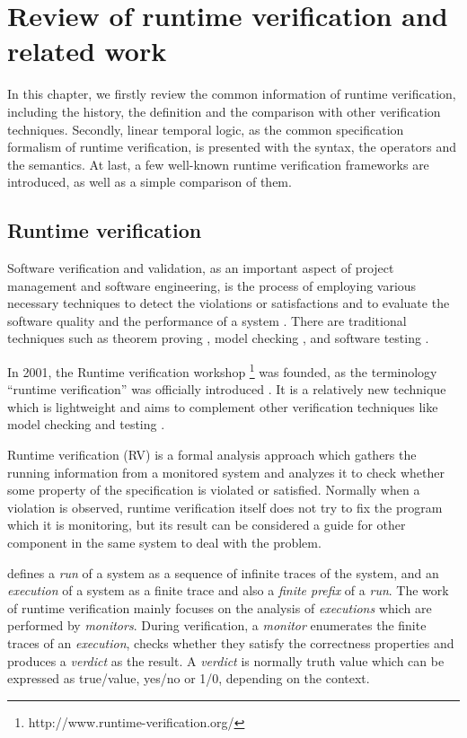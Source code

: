 
\chapter{Review of runtime verification and related work}

In this chapter, we firstly review the common information of runtime verification, including the history, the definition and the comparison with other verification techniques. Secondly, linear temporal logic, as the common specification formalism of runtime verification, is presented with the syntax, the operators and the semantics. At last, a few well-known runtime verification frameworks are introduced, as well as a simple comparison of them.

\section{Runtime verification}

Software verification and validation, as an important aspect of project management and software engineering, is the process of employing various necessary techniques to detect the violations or satisfactions and to evaluate the software quality and the performance of a system \citep{ieeestd2012}. There are traditional techniques such as theorem proving \citep{heisel1990tactical}, model checking \citep{clarke1999model}, and software testing \citep{myers2011art}.

In 2001, the Runtime verification workshop \footnote{http://www.runtime-verification.org/} was founded, as the terminology ``runtime verification'' was officially introduced \citep{wiki:rv}. It is a relatively new technique which is lightweight and aims to complement other verification techniques like model checking and testing \citep{leucker2009brief}. 

Runtime verification (RV) is a formal analysis approach which gathers the running information from a monitored system and analyzes it to check whether some property of the specification is violated or satisfied. Normally when a violation is observed, runtime verification itself does not try to fix the program which it is monitoring, but its result can be considered a guide for other component in the same system to deal with the problem.

\cite{leucker2009brief} defines a \emph{run} of a system as a sequence of infinite traces of the system, and an \emph{execution} of a system as a finite trace and also a \emph{finite prefix} of a \emph{run}. The work of runtime verification mainly focuses on the analysis of \emph{executions} which are performed by \emph{monitors}. During verification, a \emph{monitor} enumerates the finite traces of an \emph{execution}, checks whether they satisfy the correctness properties and produces a \emph{verdict} as the result. A \emph{verdict} is normally truth value which can be expressed as true/value, yes/no or 1/0, depending on the context.

